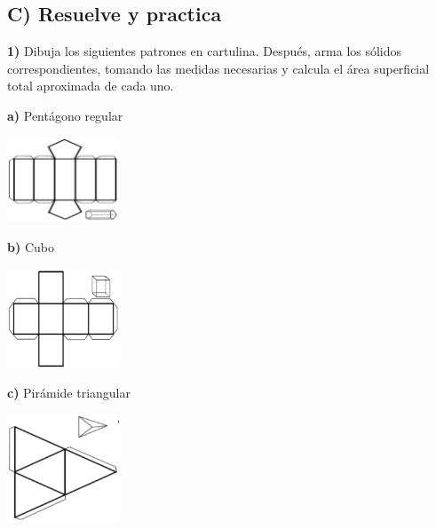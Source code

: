 \documentclass[12pt,a4paper]{article}
\begin{document}
\subsection*{C) Resuelve y practica}

\begin{multicols}{2}

\textbf{1)} Dibuja los siguientes patrones en cartulina. Después, arma los sólidos correspondientes, tomando las medidas necesarias y calcula el área superficial total aproximada de cada uno.

\textbf{a)} Pentágono regular

\begin{center}
\includegraphics[width=0.25\textwidth]{Figuras/fig79.png}
\end{center}

\vspace{2mm}

\textbf{b)} Cubo

\begin{center}
\includegraphics[width=0.25\textwidth]{Figuras/fig80.png}
\end{center}

\vspace{2mm}

\textbf{c)} Pirámide triangular

\begin{center}
\includegraphics[width=0.25\textwidth]{Figuras/fig81.png}
\end{center}

\vspace{2mm}


\end{multicols}
\end{document}
